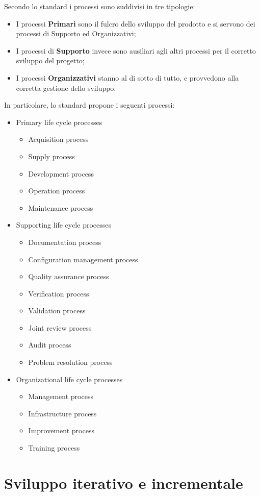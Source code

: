 Secondo lo standard i processi sono suddivisi in tre tipologie:
\begin{itemize}
\item I processi \textbf{Primari} sono il fulcro dello sviluppo del prodotto e si servono dei processi di Supporto ed Organizzativi;
\item I processi di \textbf{Supporto} invece sono ausiliari agli altri processi per il corretto sviluppo del progetto;
\item I processi \textbf{Organizzativi} stanno al di sotto di tutto, e provvedono alla corretta gestione dello sviluppo.
\end{itemize}
In particolare, lo standard propone i seguenti processi:
\begin{itemize}
\item Primary life cycle processes
\begin{itemize}
\item Acquisition process
\item Supply process
\item Development process
\item Operation process
\item Maintenance process
\end{itemize}
\item Supporting life cycle processes
\begin{itemize}
\item Documentation process
\item Configuration management process
\item Quality assurance process
\item Verification process
\item Validation process
\item Joint review process
\item Audit process
\item Problem resolution process
\end{itemize}
\item Organizational life cycle processes
\begin{itemize}
\item Management process
\item Infrastructure process
\item Improvement process
\item Training process
\end{itemize}
\end{itemize}

\section{Sviluppo iterativo e incrementale}

